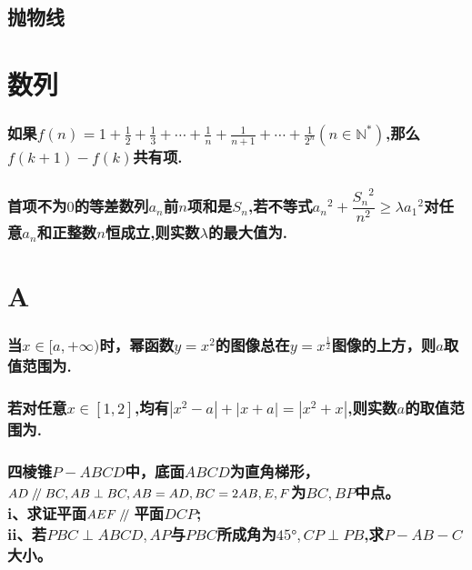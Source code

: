 \documentclass[oneside]{book}
\newcommand{\1}{\underline{\makebox[1cm]{}}}
\newcommand{\2}{\underline{\makebox[2cm]{}}}
\newcommand{\3}{\underline{\makebox[3cm]{}}}
\newcommand{\4}{\underline{\makebox[4cm]{}}}
\newcommand{\blk}{\vspace*{1\baselineskip} }
\newcommand{\blkc}{\vspace*{6\baselineskip} }
\newcommand{\pll}{\kern 0.56em/\kern -0.8em /\kern 0.56em}
\newlength{\la}
\begin{document}
    \chapter{抛物线}



\part{数列}

    \section{如果$f(n)=1+\frac{1}{2}+\frac{1}{3}+\cdots+\frac{1}{n}+\frac{1}{n+1}+\cdots+\frac{1}{2^n}(n\in \mathbb{N^*})$,那么$f(k+1)-f(k)$共有\2项.}
    \blk

    \section{首项不为$0$的等差数列${a_n}$前$n$项和是$S_n$,若不等式${a_n}^2+\dfrac{{S_n}^2}{n^2}\geq \lambda {a_1}^2$对任意$a_n$和正整数$n$恒成立,则实数$\lambda$的最大值为\2.}
    \blkc

    

\part{A}
    
    \section{当$x \in [a, + \infty)$时，幂函数$y=x^2$的图像总在$y=x^{\frac{1}{2}}$图像的上方，则$a$取值范围为\2.}
    \blkc
    
    \section{若对任意$x \in[1,2]$,均有$|x^2-a|+|x+a|=|x^2+x|$,则实数$a$的取值范围为\2.}
    \blkc

    \section{四棱锥$P-ABCD$中，底面$ABCD$为直角梯形，$AD \pll BC, AB \perp BC,AB = AD,BC = 2AB,E,F$为$BC,BP$中点。\\ i、求证平面$AEF \pll $平面$DCP$; \\ ii、若$PBC \perp ABCD,AP$与$PBC$所成角为$45 °, CP \perp PB$,求$P-AB-C$大小。}
    \blkc
\end{document}
